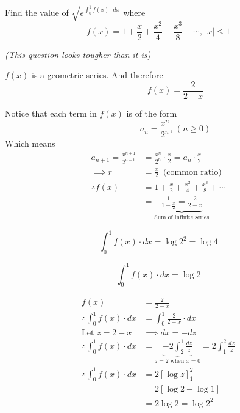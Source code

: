 \documentclass[14pt,fleqn]{extarticle}
\newcommand\fxe{1+\frac{x}{2} + \frac{x^2}{4} + \frac{x^3}{8} + \cdots}
\begin{document}
 
\begin{question}
	\statement 
    
    Find the value of $\sqrt{e^{\int_0^1 f(x)\cdot dx}}$ where 
    \[ f(x) = \fxe,\, \vert x\vert \leq 1  \]
    
    \textit{(This question looks tougher than it is)}

	\begin{step}
  \begin{options} 
     \correct 
       
     $f(x)$ is a geometric series. And therefore 
     \[ \qquad\qquad f(x) = \frac{2}{2-x} \]
        
    \end{options} 
     \reason 
     
     Notice that each term in $f(x)$ is of the form 
     \[ \qquad\qquad a_n = \frac{x^n}{2^n},\, \left(n\geq 0 \right)\]
     Which means 
     \begin{align}
     a_{n+1} = \frac{x^{n+1}}{2^{n+1}} &= \frac{x^n}{2^n}\cdot\frac{x}{2} = a_n\cdot\frac{x}{2} \\[10pt]
     \implies r &= \frac{x}{2}\,\text{ (common ratio)} \\
     \therefore f(x) &= \fxe \\[-5pt]
     &= \underbrace{\frac{1}{1-\frac{x}{2}} = \frac{2}{2-x}}_{\text{Sum of infinite series}}
\end{align}
       
\end{step}

\begin{step}
  \begin{options} 
     \correct 
     
     \[ \int_0^1 f(x)\cdot dx = \log 2^2 = \log 4 \]
       
     \incorrect
     
     \[ \int_0^1 f(x)\cdot dx = \log 2 \]
    \end{options} 
     \reason
     
     \begin{align}
     f(x) &= \frac{2}{2-x} \\
     \therefore \int_0^1 f(x)\cdot dx &= \int_0^1\frac{2}{2-x}\cdot dx \\
     \text{Let } z = 2-x &\implies dx = -dz  \\
     \therefore \int_0^1 f(x)\cdot dx &= \underbrace{-2\int_2^1\frac{dz}{z}}_{z = 2\text{ when } x = 0} = 2\int_1^2\frac{dz}{z} \\
     \therefore \int_0^1 f(x)\cdot dx &= 2 \left[\log z \right]_1^2 \\ 
     &= 2 \left[\log 2 - \log 1 \right] \\
     &= 2\log 2 = \log 2^2 
\end{align} 
       

\end{step}
\end{question}
\end{document}

